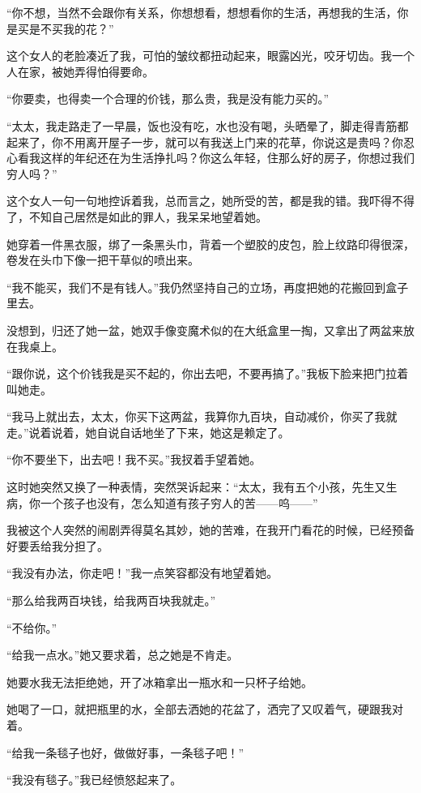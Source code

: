 \par “你不想，当然不会跟你有关系，你想想看，想想看你的生活，再想我的生活，你是买是不买我的花？”
\par 这个女人的老脸凑近了我，可怕的皱纹都扭动起来，眼露凶光，咬牙切齿。我一个人在家，被她弄得怕得要命。
\par “你要卖，也得卖一个合理的价钱，那么贵，我是没有能力买的。”
\par “太太，我走路走了一早晨，饭也没有吃，水也没有喝，头晒晕了，脚走得青筋都起来了，你不用离开屋子一步，就可以有我送上门来的花草，你说这是贵吗？你忍心看我这样的年纪还在为生活挣扎吗？你这么年轻，住那么好的房子，你想过我们穷人吗？”
\par 这个女人一句一句地控诉着我，总而言之，她所受的苦，都是我的错。我吓得不得了，不知自己居然是如此的罪人，我呆呆地望着她。
\par 她穿着一件黑衣服，绑了一条黑头巾，背着一个塑胶的皮包，脸上纹路印得很深，卷发在头巾下像一把干草似的喷出来。
\par “我不能买，我们不是有钱人。”我仍然坚持自己的立场，再度把她的花搬回到盒子里去。
\par 没想到，归还了她一盆，她双手像变魔术似的在大纸盒里一掏，又拿出了两盆来放在我桌上。
\par “跟你说，这个价钱我是买不起的，你出去吧，不要再搞了。”我板下脸来把门拉着叫她走。
\par “我马上就出去，太太，你买下这两盆，我算你九百块，自动减价，你买了我就走。”说着说着，她自说自话地坐了下来，她这是赖定了。
\par “你不要坐下，出去吧！我不买。”我扠着手望着她。
\par 这时她突然又换了一种表情，突然哭诉起来：“太太，我有五个小孩，先生又生病，你一个孩子也没有，怎么知道有孩子穷人的苦——呜——”
\par 我被这个人突然的闹剧弄得莫名其妙，她的苦难，在我开门看花的时候，已经预备好要丢给我分担了。
\par “我没有办法，你走吧！”我一点笑容都没有地望着她。
\par “那么给我两百块钱，给我两百块我就走。”
\par “不给你。”
\par “给我一点水。”她又要求着，总之她是不肯走。
\par 她要水我无法拒绝她，开了冰箱拿出一瓶水和一只杯子给她。
\par 她喝了一口，就把瓶里的水，全部去洒她的花盆了，洒完了又叹着气，硬跟我对着。
\par “给我一条毯子也好，做做好事，一条毯子吧！”
\par “我没有毯子。”我已经愤怒起来了。
